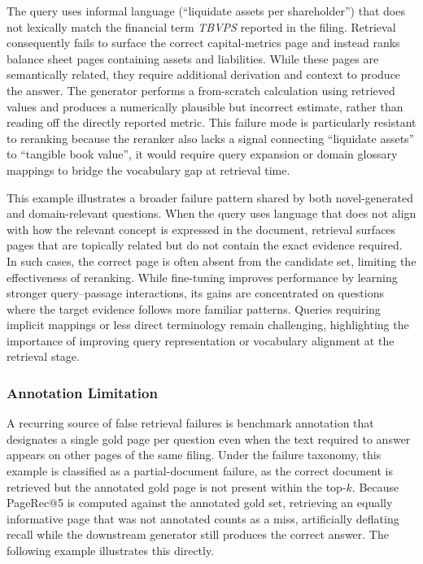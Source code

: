 \documentclass[12pt,twoside,maitrise]{dms}
\newcounter{example}
\theoremstyle{definition}
\numberwithin{equation}{section}
\numberwithin{table}{chapter}
\numberwithin{figure}{chapter}
\begin{document}
The query uses informal language (``liquidate assets per shareholder'') that does not
lexically match the financial term \emph{TBVPS} reported in the
filing.  Retrieval consequently fails to surface the correct capital-metrics page and
instead ranks balance sheet pages containing assets and liabilities. While these pages
are semantically related, they require additional derivation and context to produce the answer.  The
generator performs a from-scratch calculation using retrieved values and produces a
numerically plausible but incorrect estimate, rather than reading off the directly
reported metric.  This failure mode is particularly resistant to reranking because the
reranker also lacks a signal connecting ``liquidate assets'' to ``tangible book value'',
it would require query expansion or domain glossary mappings to bridge the vocabulary
gap at retrieval time.

This example illustrates a broader failure pattern shared by both novel-generated and
domain-relevant questions. When the query uses language that does not align with how
the relevant concept is expressed in the document, retrieval surfaces pages that are
topically related but do not contain the exact evidence required. In such cases, the
correct page is often absent from the candidate set, limiting the effectiveness of
reranking. While fine-tuning improves performance by learning stronger query–passage
interactions, its gains are concentrated on questions where the target evidence follows
more familiar patterns. Queries requiring implicit mappings or less direct terminology
remain challenging, highlighting the importance of improving query representation or
vocabulary alignment at the retrieval stage.

\subsubsection{Annotation Limitation}
\label{sec:fail_annot}

A recurring source of false retrieval failures is benchmark annotation that designates a
single gold page per question even when the text required to answer appears on other
pages of the same filing.  Under the failure taxonomy, this example is classified as a partial-document failure, as the correct document is retrieved but the annotated gold page is not present within the top-$k$. Because PageRec@5 is computed against the annotated gold set,
retrieving an equally informative page that was not annotated counts as a miss,
artificially deflating recall while the downstream generator still produces the correct
answer.  The following example illustrates this directly.
\end{document}
